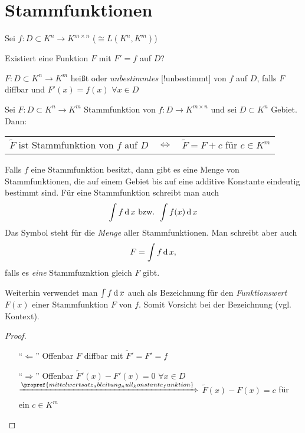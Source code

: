 \section{Stammfunktionen} \setcounter{equation}{0}
Sei $f:D\subset K^n\to K^{m\times n}$ ($\cong L(K^n, K^m)$)

\begin{underlinedenvironment}[Frage]
	Existiert eine Funktion $F$ mit $F' = f$ auf $D$?
\end{underlinedenvironment}

\begin{*definition}
	$F: D\subset K^n\to K^m$ heißt  oder \emph{unbestimmtes} [!unbestimmt] von $f$ auf $D$, falls $F$ \gls{diffbar} und $F'(x) = f(x)$ $\forall x\in D$
\end{*definition}

\begin{proposition}
	Sei $F:D\subset K^n\to K^m$ Stammfunktion von $f:D\to K^{m\times n}$ und sei $D\subset K^n$ Gebiet. Dann:
	
	\begin{tabularx}{\linewidth}{X@{\ \ }c@{\ \ }X}
		\hfill$\tilde{F}$ ist Stammfunktion von $f$ auf $D$ & $\Leftrightarrow$ & $\tilde{F} = F + c$ für $c\in K^{m}$
	\end{tabularx}

	Falls $f$ eine Stammfunktion besitzt, dann gibt es eine Menge von Stammfunktionen, die auf einem Gebiet bis auf eine additive Konstante eindeutig bestimmt sind. Für eine Stammfunktion schreibt man auch \begin{align*}
		\int f \operatorname{d} x \text{ bzw. } \int f(x) \operatorname{d} x
	\end{align*}
	Das Symbol steht für die \emph{Menge} aller Stammfunktionen. Man schreibt aber auch \begin{align*}
		F = \int f \operatorname{d} x,
	\end{align*} falls es \emph{eine} Stammfuznktion gleich $F$ gibt.
	
	Weiterhin verwendet man $\int f\operatorname{d} x$ auch als Bezeichnung für den \emph{Funktionswert} $F(x)$ einer Stammfunktion $F$ von $f$. Somit Vorsicht bei der Bezeichnung (vgl. Kontext).
\end{proposition}

\begin{proof}
	 \hspace*{0pt}
	\begin{itemize}[topsep=\dimexpr -\baselineskip / 2\relax]
		\item["`$\Leftarrow$"'] Offenbar $F$ \gls{diffbar} mit $\tilde{F}' = F' = f$
		\item["`$\Rightarrow$"'] Offenbar $\tilde{F}'(x) - F'(x) = 0$ $\forall x\in D$ 
		$\xRightarrow{\propref{mittelwertsatz_ableitung_null_konstante_funktion}}$ $\tilde{F}(x) - F(x) = c$ für ein $c\in K^m$
	\end{itemize}
\end{proof}

